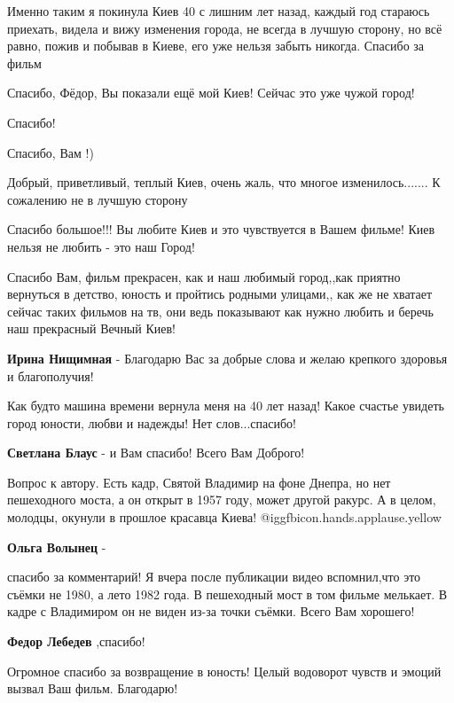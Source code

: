 \begin{itemize}
Именно таким я покинула Киев 40 с лишним лет назад, каждый год стараюсь
приехать, видела и вижу изменения города, не всегда в лучшую сторону, но всё
равно, пожив и побывав в Киеве, его уже нельзя забыть никогда. Спасибо за
фильм

Спасибо, Фёдор, Вы показали ещё мой Киев! Сейчас это уже чужой город!

Спасибо!

Спасибо, Вам !)

Добрый, приветливый, теплый Киев, очень жаль, что многое изменилось....... К сожалению не в лучшую сторону

Спасибо большое!!! Вы любите Киев и это чувствуется в Вашем фильме! Киев нельзя не любить - это наш Город!


Спасибо Вам, фильм прекрасен, как и наш любимый город,,как приятно вернуться в
детство, юность и пройтись родными улицами,, как же не хватает сейчас таких
фильмов на тв, они ведь показывают как нужно любить и беречь наш прекрасный
Вечный Киев!

\textbf{Ирина Нищимная} - Благодарю Вас за добрые слова и желаю крепкого здоровья и благополучия!


Как будто машина времени вернула меня на 40 лет назад! Какое счастье увидеть
город юности, любви и надежды! Нет слов...спасибо!

\textbf{Светлана Блаус} - и Вам спасибо! Всего Вам Доброго!


Вопрос к автору. Есть кадр, Святой Владимир на фоне Днепра, но нет пешеходного
моста, а он открыт в 1957 году, может другой ракурс. А в целом, молодцы, окунули в
прошлое красавца Киева! @igg{fbicon.hands.applause.yellow} 

\textbf{Ольга Волынец} - 

спасибо за комментарий! Я вчера после публикации видео вспомнил,что это съёмки
не 1980, а лето 1982 года. В пешеходный мост в том фильме мелькает. В кадре с
Владимиром он не виден из-за точки съёмки. Всего Вам хорошего!


\textbf{Федор Лебедев} ,спасибо!


Огромное спасибо за возвращение в юность! Целый водоворот чувств и эмоций
вызвал Ваш фильм. Благодарю!



\end{itemize}
